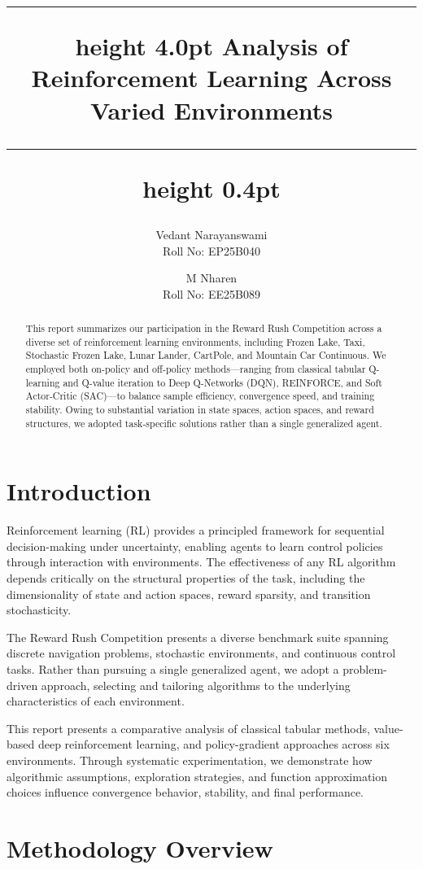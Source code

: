 \documentclass[10pt]{article}
\title{
  \vspace{-1.2em}
  \hrule height 4.0pt
  \vspace{0.7em}
  \centering
  \textbf{Analysis of Reinforcement Learning Across Varied Environments}
  \vspace{0.7em}
  \hrule height 0.4pt
  \vspace{1em}
}
\author{Vedant Narayanswami\\
Roll No: EP25B040
\and M Nharen\\
Roll No: EE25B089}
\begin{document}
\maketitle

\begin{abstract}
This report summarizes our participation in the Reward Rush Competition across a diverse set of reinforcement learning environments, including Frozen Lake, Taxi, Stochastic Frozen Lake, Lunar Lander, CartPole, and Mountain Car Continuous. We employed both on-policy and off-policy methods—ranging from classical tabular Q-learning and Q-value iteration to Deep Q-Networks (DQN), REINFORCE, and Soft Actor-Critic (SAC)—to balance sample efficiency, convergence speed, and training stability. Owing to substantial variation in state spaces, action spaces, and reward structures, we adopted task-specific solutions rather than a single generalized agent.
\end{abstract}

\section{Introduction}

Reinforcement learning (RL) provides a principled framework for sequential decision-making under uncertainty, enabling agents to learn control policies through interaction with environments. The effectiveness of any RL algorithm depends critically on the structural properties of the task, including the dimensionality of state and action spaces, reward sparsity, and transition stochasticity.

The Reward Rush Competition presents a diverse benchmark suite spanning discrete navigation problems, stochastic environments, and continuous control tasks. Rather than pursuing a single generalized agent, we adopt a problem-driven approach, selecting and tailoring algorithms to the underlying characteristics of each environment.

This report presents a comparative analysis of classical tabular methods, value-based deep reinforcement learning, and policy-gradient approaches across six environments. Through systematic experimentation, we demonstrate how algorithmic assumptions, exploration strategies, and function approximation choices influence convergence behavior, stability, and final performance.

\section{Methodology Overview}
\vspace{1em}
\end{document}
